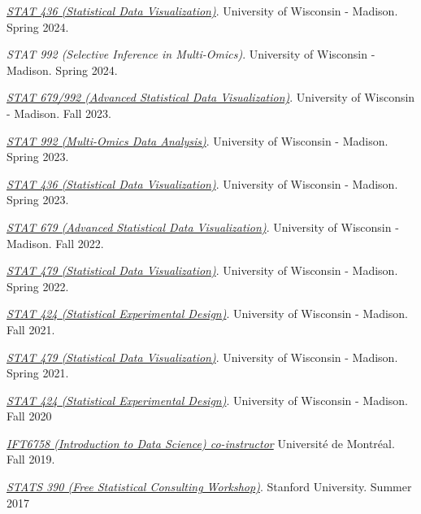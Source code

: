 \documentclass[letterpaper]{article}
\renewenvironment{itemize}{
  \begin{list}{}{
    \setlength{\leftmargin}{1.5em}
  }
}{
  \end{list}
}
\begin{document}
\begin{itemize}
\item \textit{\href{https://krisrs1128.github.io/stat436_s24/}{STAT 436 (Statistical Data Visualization)}}.
University of Wisconsin - Madison. Spring 2024.
\item \textit{STAT 992 (Selective Inference in Multi-Omics)}. University of Wisconsin - Madison. Spring 2024.
\item \textit{\href{https://krisrs1128.github.io/stat992_f23/}{STAT 679/992 (Advanced Statistical Data Visualization)}}.
University of Wisconsin - Madison. Fall 2023.
\item \textit{\href{https://krisrs1128.github.io/stat992_s23/}{STAT 992 (Multi-Omics Data Analysis)}}. 
University of Wisconsin - Madison. Spring 2023.
\item \textit{\href{https://krisrs1128.github.io/stat436_s23/}{STAT 436 (Statistical Data Visualization)}}.
University of Wisconsin - Madison. Spring 2023.
\item \textit{\href{https://krisrs1128.github.io/stat679_notes/}{STAT 679 (Advanced Statistical Data Visualization)}}.
University of Wisconsin - Madison. Fall 2022.
\item \textit{\href{https://github.com/krisrs1128/stat479_s22}{STAT 479 (Statistical Data Visualization)}}.
University of Wisconsin - Madison. Spring 2022.
\item \textit{\href{https://krisrs1128.github.io/stat424_f21}{STAT 424 (Statistical Experimental Design)}}.
University of Wisconsin - Madison. Fall 2021.
\item \textit{\href{https://krisrs1128/github.io/stat479/}{STAT 479 (Statistical Data Visualization)}}.
University of Wisconsin - Madison. Spring 2021.
\item \textit{\href{https://mediaspace.wisc.edu/channel/STAT424Fall2020/180027062}{STAT
424 (Statistical Experimental Design)}}. University of Wisconsin - Madison. Fall
2020
\item \textit{\href{https://ift6758.github.io/}{IFT6758 (Introduction to Data Science) co-instructor}}
Universit\'e de Montr\'eal. Fall 2019.
\item \href{https://www.overleaf.com/10240923zrkwyvndkwnn#/37916755/}{\textit{STATS 390 (Free Statistical Consulting Workshop)}}.
  Stanford University. Summer 2017
\end{itemize}
\end{document}

